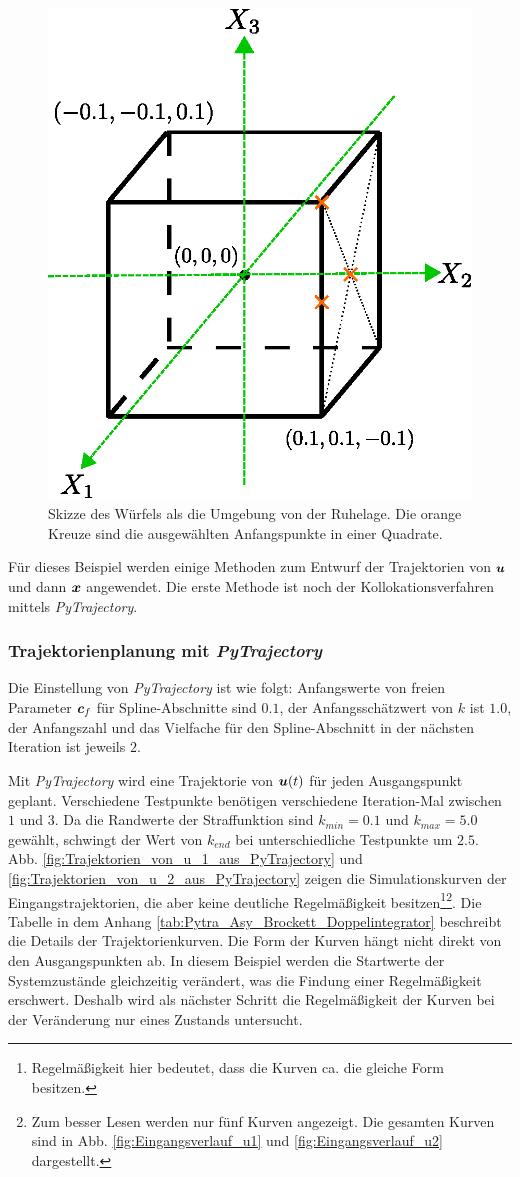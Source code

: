 \begin{figure}
	\centering
	\includegraphics[width=0.35\linewidth]{bild/modul/Asy_plot.eps}%
	\caption{Skizze des Würfels als die Umgebung von der Ruhelage. Die orange Kreuze sind die ausgewählten Anfangspunkte in einer Quadrate.}
	\label{fig:Asy_plot}
\end{figure}

Für dieses Beispiel werden einige Methoden zum Entwurf der Trajektorien von $\boldsymbol u$ und dann $\boldsymbol x$ angewendet. Die erste Methode ist noch der Kollokationsverfahren mittels \emph{PyTrajectory}. 

\subsubsection{Trajektorienplanung mit \emph{PyTrajectory}}
Die Einstellung von \emph{PyTrajectory} ist wie folgt: Anfangswerte von freien Parameter $\boldsymbol c_{f}$ für Spline-Abschnitte sind $0.1$, der Anfangsschätzwert von $k$ ist $1.0$, der Anfangszahl und das Vielfache für den Spline-Abschnitt in der nächsten Iteration ist jeweils $2$.


Mit \emph{PyTrajectory} wird eine Trajektorie von $\boldsymbol u(t)$ für jeden Ausgangspunkt geplant. Verschiedene Testpunkte benötigen verschiedene Iteration-Mal zwischen $1$ und $3$. Da die Randwerte der Straffunktion sind $k_{min}=0.1$ und $k_{max}=5.0$ gewählt, schwingt der Wert von $k_{end}$ bei unterschiedliche Testpunkte um $2.5$. Abb. \ref{fig:Trajektorien_von_u_1_aus_PyTrajectory} und \ref{fig:Trajektorien_von_u_2_aus_PyTrajectory} zeigen die Simulationskurven der Eingangstrajektorien, die aber keine deutliche Regelmäßigkeit besitzen\footnote{Regelmäßigkeit hier bedeutet, dass die Kurven ca. die gleiche Form besitzen.}\footnote{Zum besser Lesen werden nur fünf Kurven angezeigt. Die gesamten Kurven sind in Abb. \ref{fig:Eingangsverlauf_u1} und \ref{fig:Eingangsverlauf_u2} dargestellt.}. Die Tabelle in dem Anhang \ref{tab:Pytra_Asy_Brockett_Doppelintegrator} beschreibt die Details der Trajektorienkurven. Die Form der Kurven hängt nicht direkt von den Ausgangspunkten ab. In diesem Beispiel werden die Startwerte der Systemzustände gleichzeitig verändert, was die Findung einer Regelmäßigkeit erschwert. Deshalb wird als nächster Schritt die Regelmäßigkeit der Kurven bei der Veränderung nur eines Zustands untersucht.

